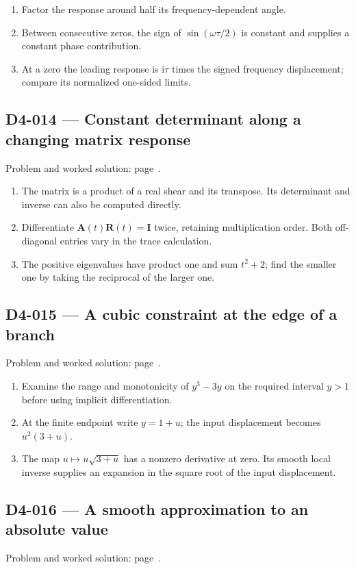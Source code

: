 \documentclass[11pt,oneside,openany]{book}
\begin{document}
\begin{enumerate}
\item Factor the response around half its frequency-dependent angle.
\item Between consecutive zeros, the sign of \(\sin(\omega\tau/2)\) is constant and supplies a constant phase contribution.
\item At a zero the leading response is \(\mathrm i\tau\) times the signed frequency displacement; compare its normalized one-sided limits.
\end{enumerate}
\subsection*{D4-014 --- Constant determinant along a changing matrix response}
\label{hints:D4-014}
Problem and worked solution: page~\pageref{problem:D4-014}.

\begin{enumerate}
\item The matrix is a product of a real shear and its transpose. Its determinant and inverse can also be computed directly.
\item Differentiate \(\mathbf A(t)\mathbf R(t)=\mathbf I\) twice, retaining multiplication order. Both off-diagonal entries vary in the trace calculation.
\item The positive eigenvalues have product one and sum \(t^2+2\); find the smaller one by taking the reciprocal of the larger one.
\end{enumerate}
\subsection*{D4-015 --- A cubic constraint at the edge of a branch}
\label{hints:D4-015}
Problem and worked solution: page~\pageref{problem:D4-015}.

\begin{enumerate}
\item Examine the range and monotonicity of \(y^3-3y\) on the required interval \(y>1\) before using implicit differentiation.
\item At the finite endpoint write \(y=1+u\); the input displacement becomes \(u^2(3+u)\).
\item The map \(u\mapsto u\sqrt{3+u}\) has a nonzero derivative at zero. Its smooth local inverse supplies an expansion in the square root of the input displacement.
\end{enumerate}
\subsection*{D4-016 --- A smooth approximation to an absolute value}
\label{hints:D4-016}
Problem and worked solution: page~\pageref{problem:D4-016}.
\end{document}
